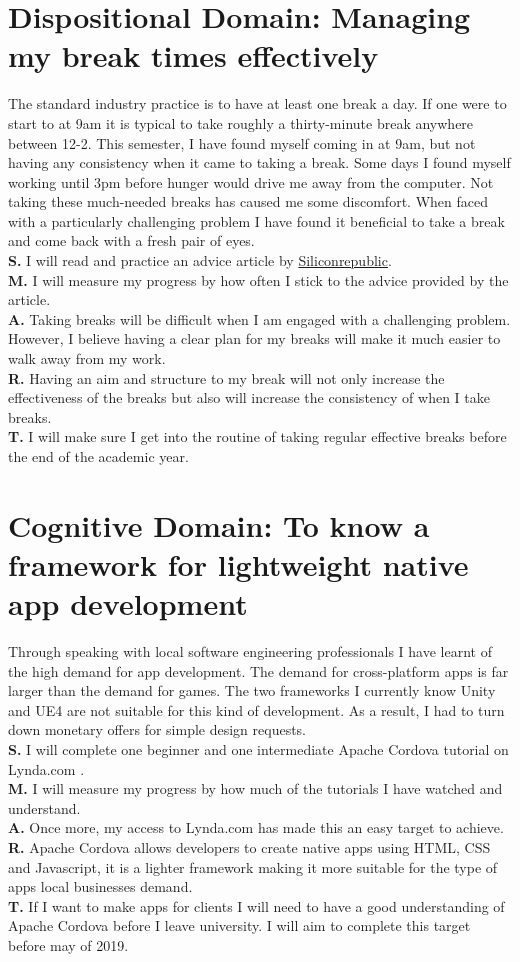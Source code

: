 \documentclass{scrartcl}
\begin{document}
\section{Dispositional Domain: Managing my break times effectively}
The standard industry practice is to have at least one break a day. If one were to start to at 9am it is typical to take roughly a thirty-minute break anywhere between 12-2. This semester, I have found myself coming in at 9am, but not having any consistency when it came to taking a break. Some days I found myself working until 3pm before hunger would drive me away from the computer. Not taking these much-needed breaks has caused me some discomfort. When faced with a particularly challenging problem I have found it beneficial to take a break and come back with a fresh pair of eyes. \\
\textbf{S.} I will read and practice an advice article by \href{https://www.siliconrepublic.com/advice/work-breaks-stress-productivity}{Siliconrepublic}.\\
\textbf{M.} I will measure my progress by how often I stick to the advice provided by the article.\\
\textbf{A.} Taking breaks will be difficult when I am engaged with a challenging problem. However, I believe having a clear plan for my breaks will make it much easier to walk away from my work.\\
\textbf{R.} Having an aim and structure to my break will not only increase the effectiveness of the breaks but also will increase the consistency of when I take breaks. \\
\textbf{T.} I will make sure I get into the routine of taking regular effective breaks before the end of the academic year. 

\section{Cognitive Domain: To know a framework for lightweight native app development}
 Through speaking with local software engineering professionals I have learnt of the high demand for app development. The demand for cross-platform apps is far larger than the demand for games. The two frameworks I currently know Unity  and UE4  are not suitable for this kind of development. As a result, I had to turn down monetary offers for simple design requests. \\
\textbf{S.} I will complete one beginner and one intermediate Apache Cordova tutorial on Lynda.com .\\
\textbf{M.} I will measure my progress by how much of the tutorials I have watched and understand.\\
\textbf{A.} Once more, my access to Lynda.com has made this an easy target to achieve.\\
\textbf{R.} Apache Cordova allows developers to create native apps using HTML, CSS and Javascript, it is a lighter framework making it more suitable for the type of apps local businesses demand.\\
\textbf{T.} If I want to make apps for clients I will need to have a good understanding of Apache Cordova before I leave university. I will aim to complete this target before may of 2019.\\
\end{document}
